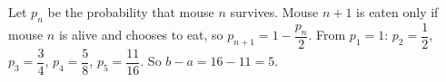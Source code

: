 Let $p_n$ be the probability that mouse $n$ survives. Mouse $n+1$ is eaten only if mouse $n$ is alive and chooses to eat, so $p_{n+1}=1-\dfrac{p_n}2$. From $p_1=1$: $p_2=\dfrac12$, $p_3=\dfrac34$, $p_4=\dfrac58$, $p_5=\dfrac{11}{16}$. So $b-a=16-11=\boxed{5}$.
